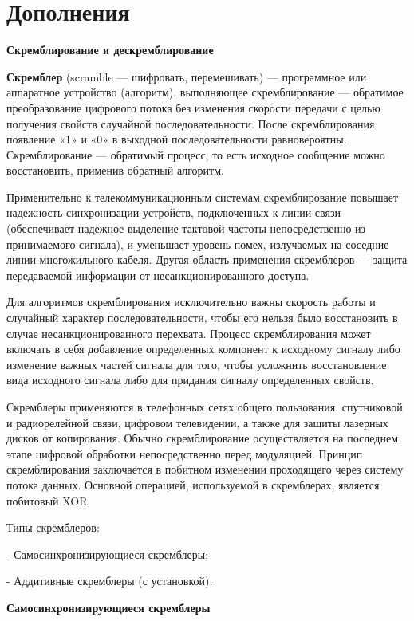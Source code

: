 \section {Дополнения}

  \begin{center}
  \large
  \bf Скремблирование и дескремблирование
\end{center}

{\bf {Скремблер}} (scramble — шифровать, перемешивать) — программное или аппаратное устройство (алгоритм), выполняющее скремблирование — обратимое преобразование цифрового потока без изменения скорости передачи с целью получения свойств случайной последовательности. После скремблирования появление «1» и «0» в выходной последовательности равновероятны. Скремблирование — обратимый процесс, то есть исходное сообщение можно восстановить, применив обратный алгоритм.

Применительно к телекоммуникационным системам скремблирование повышает надежность синхронизации устройств, подключенных к линии связи (обеспечивает надежное выделение тактовой частоты непосредственно из принимаемого сигнала), и уменьшает уровень помех, излучаемых на соседние линии многожильного кабеля. Другая область применения скремблеров — защита передаваемой информации от несанкционированного доступа.

Для алгоритмов скремблирования исключительно важны скорость работы и случайный характер последовательности, чтобы его нельзя было восстановить в случае несанкционированного перехвата. Процесс скремблирования может включать в себя добавление определенных компонент к исходному сигналу либо изменение важных частей сигнала для того, чтобы усложнить восстановление вида исходного сигнала либо для придания сигналу определенных свойств.

Скремблеры применяются в телефонных сетях общего пользования, спутниковой и радиорелейной связи, цифровом телевидении, а также для защиты лазерных дисков от копирования. Обычно скремблирование осуществляется на последнем этапе цифровой обработки непосредственно перед модуляцией.
Принцип скремблирования заключается в побитном изменении проходящего через систему потока данных. Основной операцией, используемой в скремблерах, является побитовый XOR.

Типы скремблеров:

 - Самосинхронизирующиеся скремблеры;
 
 - Аддитивные скремблеры (с установкой).
   
   \begin{center}
  \large
 \bf Самосинхронизирующиеся скремблеры
 \end{center}
 
